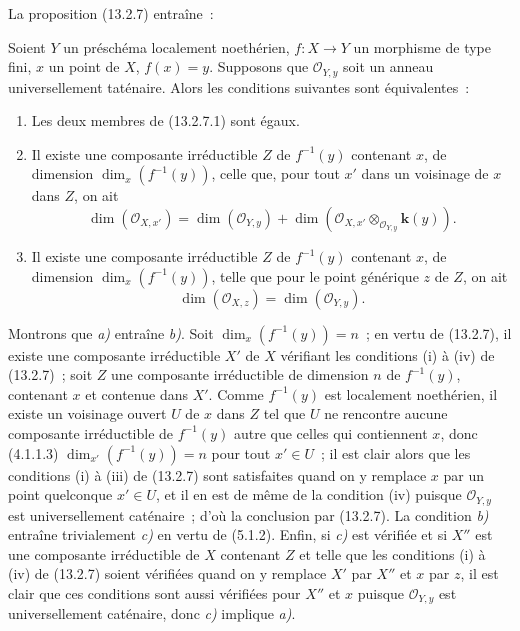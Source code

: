 La proposition (13.2.7) entraîne~:

\begin{corollary}[13.2.9]
\label{IV.13.2.9-fr}
Soient $Y$ un préschéma localement noethérien, $f:X\to Y$ un morphisme de type
fini, $x$ un point de $X$, $f(x)=y$. Supposons que $\mathcal O_{Y,y}$ soit un
anneau universellement taténaire. Alors les conditions suivantes sont
équivalentes~:
\begin{enumerate}[label=\emph{\alph*)}]
  \item Les deux membres de \textup{(13.2.7.1)} sont égaux.
  \item Il existe une composante irréductible $Z$ de $f^{-1}(y)$ contenant
  $x$, de dimension $\dim_x(f^{-1}(y))$, celle que, pour tout $x'$ dans un
  voisinage de $x$ dans $Z$, on ait
  \[
  \tag{13.2.9.1}
  \label{IV.13.2.9.1-fr}
    \dim(\mathcal O_{X,x'})=\dim(\mathcal O_{Y,y})
    +\dim(\mathcal O_{X,x'}\otimes_{\mathcal O_{Y,y}}\boldsymbol{k}(y)).
  \]
  \item Il existe une composante irréductible $Z$ de $f^{-1}(y)$ contenant
  $x$, de dimension $\dim_x(f^{-1}(y))$, telle que pour le point générique $z$
  de $Z$, on ait
  \[
  \tag{13.2.9.2}
  \label{IV.13.2.9.2-fr}
    \dim(\mathcal O_{X,z})=\dim(\mathcal O_{Y,y}).
  \]
\end{enumerate}
\end{corollary}

Montrons que \emph{a)} entraîne \emph{b)}. Soit $\dim_x(f^{-1}(y))=n$~; en vertu de
(13.2.7), il existe une composante irréductible $X'$ de $X$ vérifiant les
conditions (i) à (iv) de (13.2.7)~; soit $Z$ une composante irréductible de
dimension $n$ de $f^{-1}(y)$, contenant $x$ et contenue dans $X'$. Comme
$f^{-1}(y)$ est localement noethérien, il existe un voisinage ouvert $U$ de
$x$ dans $Z$ tel que $U$ ne rencontre aucune composante irréductible de
$f^{-1}(y)$ autre que celles qui contiennent $x$, donc (4.1.1.3)
$\dim_{x'}(f^{-1}(y))=n$ pour tout $x'\in U$~; il est clair alors que les
conditions (i) à (iii) de (13.2.7) sont satisfaites quand on y remplace $x$
par un point quelconque $x'\in U$, et il en est de même de la condition (iv)
puisque $\mathcal O_{Y,y}$ est universellement caténaire~; d'où la conclusion
par (13.2.7). La condition \emph{b)} entraîne trivialement \emph{c)} en vertu de
(5.1.2). Enfin, si \emph{c)} est vérifiée et si $X''$ est une composante
irréductible de $X$ contenant $Z$ et telle que les conditions (i) à (iv) de
(13.2.7) soient vérifiées quand on y remplace $X'$ par $X''$ et $x$ par $z$,
il est clair que ces conditions sont aussi vérifiées pour $X''$ et $x$ puisque
$\mathcal O_{Y,y}$ est universellement caténaire, donc \emph{c)} implique \emph{a)}.

